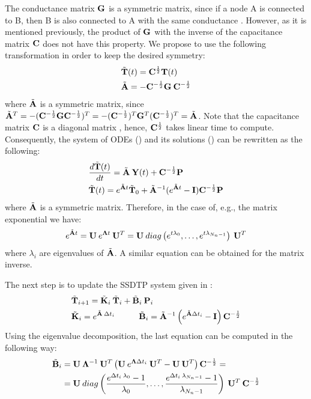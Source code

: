 The conductance matrix $\mathbf{G}$ is a symmetric matrix, since if a node A is connected to B, then B is also connected to A with the same conductance \cite{huang2003}. However, as it is mentioned previously, the product of $\mathbf{G}$ with the inverse of the capacitance matrix $\mathbf{C}$ does not have this property. We propose to use the following transformation in order to keep the desired symmetry:
\begin{align}
  & \tilde{\mathbf{T}}(t) = \mathbf{C}^{\frac{1}{2}} \mathbf{T}(t) \label{eq:substitution} \\
  & \tilde{\mathbf{A}} = -\mathbf{C}^{-\frac{1}{2}} \mathbf{G} \: \mathbf{C}^{-\frac{1}{2}} \nonumber
\end{align}
where $\tilde{\mathbf{A}}$ is a symmetric matrix, since $\tilde{\mathbf{A}}^T = -(\mathbf{C}^{-\frac{1}{2}} \mathbf{G} \mathbf{C}^{-\frac{1}{2}})^T = -(\mathbf{C}^{-\frac{1}{2}})^T \mathbf{G}^T (\mathbf{C}^{-\frac{1}{2}})^T = \tilde{\mathbf{A}}$. Note that the capacitance matrix $\mathbf{C}$ is a diagonal matrix \cite{huang2003}, hence, $\mathbf{C}^{\frac{1}{2}}$ takes linear time to compute. Consequently, the system of ODEs () and its solutions () can be rewritten as the following:
\begin{align*}
  & \frac{d\tilde{\mathbf{T}}(t)}{dt} = \tilde{\mathbf{A}} \: \mathbf{Y}(t) + \mathbf{C}^{-\frac{1}{2}} \mathbf{P} \\
  & \tilde{\mathbf{T}}(t) = e^{\tilde{\mathbf{A}} t} \tilde{\mathbf{T}}_0 + \tilde{\mathbf{A}}^{-1} (e^{\tilde{\mathbf{A}} t} - \mathbf{I}) \mathbf{C}^{-\frac{1}{2}} \mathbf{P}
\end{align*}
where $\tilde{\mathbf{A}}$ is a symmetric matrix. Therefore, in the case of, e.g., the matrix exponential we have:
\begin{equation} \label{eq:matrix-exponential}
  e^{\tilde{\mathbf{A}} t} = \mathbf{U} \: e^{\mathbf{\Lambda} t} \: \mathbf{U}^T = \mathbf{U} \: diag \left( e^{t \lambda_0}, \dots, e^{t \lambda_{N_n - 1}} \right) \: \mathbf{U}^T
\end{equation}
where $\lambda_i$ are eigenvalues of $\tilde{\mathbf{A}}$. A similar equation can be obtained for the matrix inverse.

The next step is to update the SSDTP system given in :
\begin{align}
  & \tv{T}_{i+1} = \tm{K}_i \: \tv{T}_i + \tm{B}_i \: \v{P}_i \label{eq:recurrent-equation} \\
  & \tm{K}_i = e^{\tm{A} \: \Delta t_i} \hs \tm{B}_i = \tm{A}^{-1} \left( e^{\tilde{\m{A}} \Delta t_i} - \m{I} \right) \m{C}^{-\frac{1}{2}} \nonumber
\end{align}
Using the eigenvalue decomposition, the last equation can be computed in the following way:
\begin{align*}
  \tilde{\mathbf{B}}_i & = \mathbf{U} \: \mathbf{\Lambda}^{-1} \: \mathbf{U}^T \left(\mathbf{U} \: e^{\mathbf{\Lambda} \Delta t_i} \: \mathbf{U}^T - \mathbf{U} \: \mathbf{U}^T \right) \mathbf{C}^{-\frac{1}{2}} = \\
  & = \mathbf{U} \: diag \left( \frac{e^{\Delta t_i \: \lambda_0} - 1}{\lambda_0}, \dots, \frac{e^{\Delta t_i \: \lambda_{N_n - 1}} - 1}{\lambda_{N_n - 1}} \right) \: \mathbf{U}^T \: \mathbf{C}^{-\frac{1}{2}}
\end{align*}

